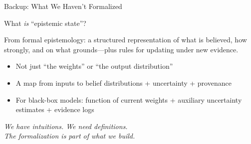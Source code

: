 \documentclass[aspectratio=169,11pt]{beamer}
\begin{document}
\begin{frame}{Backup: What We Haven't Formalized}
    \begin{center}
        \Large What \textit{is} ``epistemic state''?
    \end{center}

    \vspace{0.5em}
    \small
    From formal epistemology: a structured representation of what is believed, how strongly, and on what grounds---plus rules for updating under new evidence.

    \vspace{0.5em}
    \begin{itemize}
        \item Not just ``the weights'' or ``the output distribution''
        \item A map from inputs to belief distributions + uncertainty + provenance
        \item For black-box models: function of current weights + auxiliary uncertainty estimates + evidence logs
    \end{itemize}

    \vspace{0.5em}
    \normalsize
    \textit{We have intuitions. We need definitions.\\
    The formalization is part of what we build.}
\end{frame}
\end{document}
